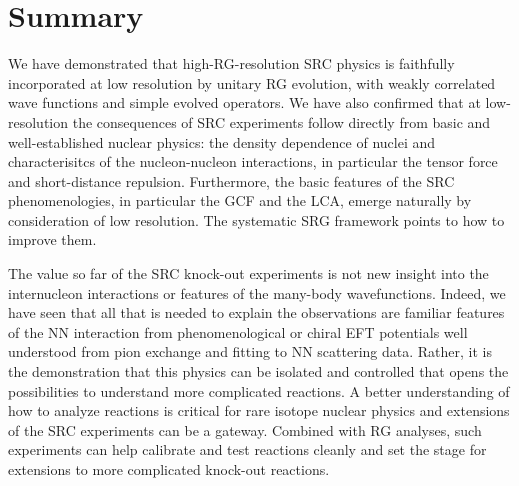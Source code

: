\documentclass[10pt,aps,prc,floatfix,twocolumn,nofootinbib]{revtex4-1}
\begin{document}
\section{Summary} \label{sec:summary}

We have demonstrated that high-RG-resolution SRC physics is faithfully incorporated at low resolution by unitary RG evolution, with weakly correlated wave functions and simple evolved operators.
We have also confirmed that at low-resolution the consequences of SRC experiments follow directly from basic and well-established nuclear physics: the density dependence of nuclei and  characterisitcs of the nucleon-nucleon interactions, in particular the tensor force and short-distance repulsion.
Furthermore, the basic features of the SRC phenomenologies, in particular the GCF and the LCA, emerge naturally by consideration of low resolution. 
The systematic SRG framework points to how to improve them.
    
The value so far  of the SRC knock-out experiments is not new insight into the internucleon interactions or features of the many-body wavefunctions.
Indeed, we have seen that all that is needed to explain the observations are familiar features of the NN interaction from phenomenological or chiral EFT potentials well understood from pion exchange and fitting to NN scattering data.
Rather, it is the demonstration that this physics can be isolated and controlled that opens the possibilities to understand more complicated reactions.
A better understanding of how to analyze reactions is critical for rare isotope nuclear physics and extensions of the SRC experiments can be a gateway.
Combined with RG analyses, such experiments can help calibrate and test reactions cleanly and set the stage for extensions to more complicated knock-out reactions.
    
\end{document}
